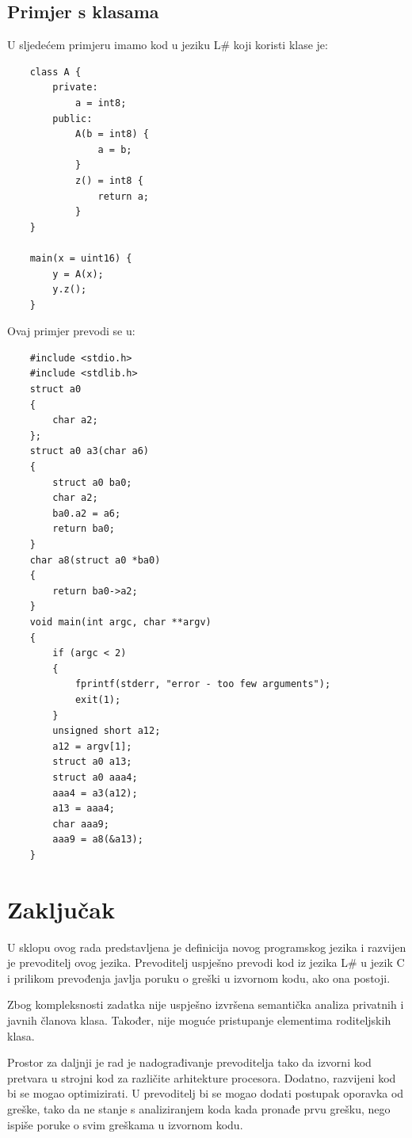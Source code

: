 \documentclass[times, utf8, zavrsni]{fer}
\begin{document}
\section{Primjer s klasama}
U sljedećem primjeru imamo kod u jeziku L\# koji koristi klase je:
\begin{verbatim}
    class A {
        private:
            a = int8;
        public:
            A(b = int8) {
                a = b;
            }
            z() = int8 {
                return a;
            }
    }

    main(x = uint16) {
        y = A(x);
        y.z();
    }
\end{verbatim}

Ovaj primjer prevodi se u:
\begin{verbatim}
    #include <stdio.h>
    #include <stdlib.h>
    struct a0
    {
        char a2;
    };
    struct a0 a3(char a6)
    {
        struct a0 ba0;
        char a2;
        ba0.a2 = a6;
        return ba0;
    }
    char a8(struct a0 *ba0)
    {
        return ba0->a2;
    }
    void main(int argc, char **argv)
    {
        if (argc < 2)
        {
            fprintf(stderr, "error - too few arguments");
            exit(1);
        }
        unsigned short a12;
        a12 = argv[1];
        struct a0 a13;
        struct a0 aaa4;
        aaa4 = a3(a12);
        a13 = aaa4;
        char aaa9;
        aaa9 = a8(&a13);
    }
\end{verbatim}

\chapter{Zaključak}
U sklopu ovog rada predstavljena je definicija novog programskog jezika i razvijen je prevoditelj ovog jezika. Prevoditelj uspješno prevodi kod iz jezika L\# u jezik
C i prilikom prevođenja javlja poruku o greški u izvornom kodu, ako ona postoji.

Zbog kompleksnosti zadatka nije uspješno izvršena semantička analiza privatnih i javnih članova klasa. Također, nije moguće pristupanje elementima roditeljskih klasa.

Prostor za daljnji je rad je nadograđivanje prevoditelja tako da izvorni kod pretvara u strojni kod za različite arhitekture procesora. Dodatno, razvijeni kod bi se
mogao optimizirati. U prevoditelj bi se mogao dodati postupak oporavka od greške, tako da ne stanje s analiziranjem koda kada pronađe prvu grešku, nego ispiše poruke 
o svim greškama u izvornom kodu.
\end{document}
